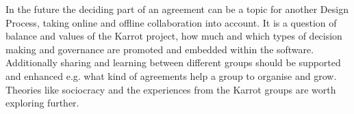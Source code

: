 \documentclass[
	a4paper,%
	11pt,%
	]{article}
\begin{document}
In the future the deciding part of an agreement can be a topic for another Design Process, taking online and offline collaboration into account. It is a question of balance and values of the Karrot project, how much and which types of decision making and governance are promoted and embedded within the software. Additionally sharing and learning between different groups should be supported and enhanced e.g. what kind of agreements help a group to organise and grow. Theories like sociocracy and the experiences from the Karrot groups are worth exploring further.
\end{document}
